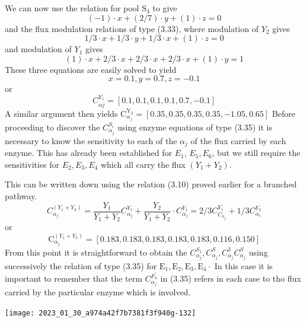 We can now use the relation for pool $\mathrm{S}_{4}$ to give
%
$$
(-1) \cdot x+(2 / 7) \cdot y+(1) \cdot z=0
$$
%
and the flux modulation relations of type (3.33), where modulation of $Y_{2}$ gives
%
$$
1 / 3 \cdot x+1 / 3 \cdot y+1 / 3 \cdot x+(1) \cdot z=0
$$
%
and modulation of $Y_{1}$ gives
%
$$
(1) \cdot x+2 / 3 \cdot x+2 / 3 \cdot x+2 / 3 \cdot x+(1) \cdot y=1
$$
%
These three equations are easily solved to yield
%
$$
x=0.1, y=0.7, z=-0.1
$$
%
or
%
$$
C_{\alpha j}^{Y_{1}}=[0.1, 0.1, 0.1, 0.1, 0.7, -0.1]
$$
%
A similar argument then yields $\mathrm{C}_{\alpha_j}^{\mathrm{Y_2}}=[0.35, 0.35, 0.35, 0.35, -1.05, 0.65]$ Before proceeding to discover the $C_{\alpha_j}^{S_{i}}$ using enzyme equations of type (3.35) it is necessary to know the sensitivity to each of the $\alpha_{j}$ of the flux carried by each enzyme. This has already been established for $E_{1}$, $E_{5}, E_{6}$, but we still require the sensitivities for $E_{2}, E_{3}, E_{4}$ which all carry the flux $\left(Y_{1}+Y_{2}\right)$.

This can be written down using the relation (3.10) proved earlier for a branched pathway.
%
$$C_{\alpha_{j}}^{\left(Y_{1}+Y_{2}\right)}=\frac{Y_{1}}{Y_{1}+Y_{2}} C_{\alpha_{j}}^{Y_{1}}+\frac{Y_{2}}{Y_{1}+Y_{2}} \cdot C_{\alpha_{j}}^{Y_{1}} = 2/3 C_{C_{\alpha_j}}^{Y_{1}}+1 / 3 C_{\alpha_{i}}^{Y_{2}}$$
%
or
%
$$\mathrm{C}_{\alpha_{j}}^{\left(Y_{1}+Y_{2}\right)} = [0.183, 0.183, 0.183, 0.183, 0.183, 0.116, 0.150]$$
%
From this point it is straightforward to obtain the $C_{\alpha_{j}}^{S_{1}}, C_{\alpha_{j}}^{S}, C_{\alpha_{j}}^{3} C_{\alpha_j}^{S}$ using successively the relation of type (3.35) for $\mathrm{E}_{1}, \mathrm{E}_{2}, \mathrm{E}_{3}, \mathrm{E}_{4} \cdot$ In this case it is important to remember that the term $C_{\alpha_{j}}^{F_{k}^{\prime}}$ in (3.35) refers in each case to tho flux carried by the particular enzyme which is involved.

\begin{center}
\texttt{[image: 2023\_01\_30\_a974a42f7b7381f3f940g-132]}
\end{center}


